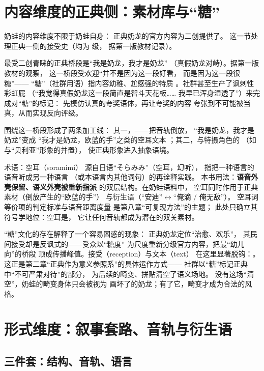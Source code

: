 \section{内容维度的正典侧：素材库与“糖”}\label{sec:06:canon}

奶蛙的内容维度不限于奶蛙自身：
正典奶龙的官方内容为二创提供了。
这一节处理正典一侧的接受史（均为  级，
据第一版教材记录）。

最受二创青睐的正典桥段是“我是奶龙，我才是奶龙”
（真假奶龙对峙）。据第一版教材的观察，
这一桥段受欢迎“并不是因为这一段好看，
而是因为这一段很糖”——
“糖”（社群用语）指内容幼稚、尬感强的特质
。社群甚至生产了讽刺性彩虹屁
（“我觉得真假奶龙这一段简直是智斗天花板……
我早已浑身湿透了”）来完成对“糖”的标记：
先模仿认真的夸奖语体，再让夸奖的内容
夸张到不可能被当真，从而实现反向评级。

围绕这一桥段形成了两条加工线：
其一，——把音轨倒放，
“我是奶龙，我才是奶龙”变成
“我才是奶龙，欧蓝的手”之类的空耳文本
；其二，与特摄角色的
（如与“贝利亚”形象的并置），
使正典形象进入抽象语境。

\begin{nltermbox}{术语：空耳（soramimi）}
  源自日语“そらみみ”（空耳，幻听），
  指把一种语言的语音听成另一种语言
  （或本语言内其他词句）的再诠释实践。
  本书用法：\textbf{语音外壳保留、语义外壳被重新指派}
  的双层结构。在奶蛙语料中，
  空耳同时作用于正典素材（倒放产生的“欧蓝的手”）
  与衍生语（“安迪”$\leftrightarrow$“俺滴 / 俺无敌”）。
  空耳词等价项的判定标准与语音距离度量
  是第八章“可复现方法”的主题；
  此处只确立其符号学地位：空耳是，
  它让任何音轨都成为潜在的双关素材。
\end{nltermbox}

“糖”文化的存在解释了一个容易困惑的现象：
正典奶龙定位“治愈、欢乐”\cite{jiang2026nailong}，
其民间接受却是反讽式的——受众以“糖度”
为尺度重新分级官方内容，把最“幼儿向”的桥段
顶成传播峰值。接受（reception）与文本（text）
在这里显著脱钩：。
这正是第二章“正典作为意义参照系”的具体运作方式——
社群以“糖”标记正典中“不可严肃对待”的部分，
为后续的畸变、拼贴清空了语义场地。
没有这场“清空”，奶蛙的畸变身体只会被视为
画坏了的奶龙；有了它，畸变才成为合法的风格。

\section{形式维度：叙事套路、音轨与衍生语}\label{sec:06:form}

\subsection{三件套：结构、音轨、语言}

